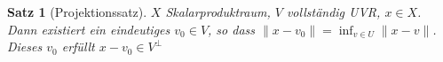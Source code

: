 \documentclass[ngerman]{report}
\theoremstyle{plain}%
\newtheorem{thm}{Satz}[chapter]
\theoremstyle{definition}%
\theoremstyle{myStyle}
\newcommand{\norm}[1]{\|#1\|}
\newcommand*{\rechterWinkel}[3]{%
\draw[shift={(#2:#3)}] (#1) arc[start angle=#2, delta angle=90, radius = #3];
\fill[shift={(#2+45:#3/2)}] (#1) circle[radius=1.25\pgflinewidth];
}
\begin{document}
	\begin{thm}[Projektionssatz]
		$X$ Skalarproduktraum, $V$ vollständig UVR, $x\in X$. Dann existiert ein eindeutiges $v_0 \in V$, so dass $\norm{x - v_0} = \inf_{v\in U} \norm{x - v}$. Dieses $v_0$ erfüllt $x - v_0 \in V^\perp$	
	\end{thm}

\end{document}
